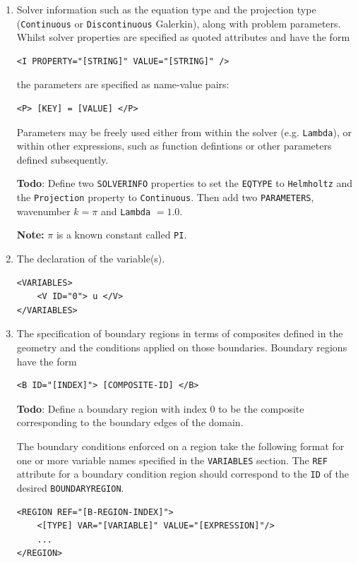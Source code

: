 \documentclass[a4paper,12pt]{article}
\begin{document}
\begin{enumerate}
\item Solver information such as the equation type and the projection type
(\texttt{Continuous} or \texttt{Discontinuous} Galerkin), along with problem
parameters. Whilst solver properties are specified as quoted
attributes and have the form
\begin{verbatim}
<I PROPERTY="[STRING]" VALUE="[STRING]" />
\end{verbatim}
the parameters are specified as name-value pairs:
\begin{verbatim}
<P> [KEY] = [VALUE] </P>
\end{verbatim}
Parameters may be freely used either from within the solver (e.g.
\texttt{Lambda}), or within other expressions, such as function defintions or
other parameters defined subsequently.

\textbf{Todo}: Define two \texttt{SOLVERINFO} properties to set the
\texttt{EQTYPE} to \texttt{Helmholtz} and the \texttt{Projection} property to
\texttt{Continuous}. Then add two \texttt{PARAMETERS}, wavenumber $k=\pi$ and
\texttt{Lambda} $=1.0$.

\smallskip
\textbf{Note: } $\pi$ is a known constant called \texttt{PI}.


\item The declaration of the variable(s).  
\begin{verbatim}
<VARIABLES>
    <V ID="0"> u </V> 
</VARIABLES>
\end{verbatim}

\item The specification of boundary regions in terms of composites defined in
the geometry and the conditions applied on those boundaries. Boundary regions
have the form
\begin{verbatim}
<B ID="[INDEX]"> [COMPOSITE-ID] </B>
\end{verbatim}

\textbf{Todo}: Define a boundary region with index 0 to be the composite
corresponding to the boundary edges of the domain. 

The boundary conditions enforced on a region take the following format for one
or more variable names specified in the \texttt{VARIABLES} section. The
\texttt{REF} attribute for a boundary condition region should correspond to the
\texttt{ID} of the desired \texttt{BOUNDARYREGION}.
\begin{verbatim}
<REGION REF="[B-REGION-INDEX]">
    <[TYPE] VAR="[VARIABLE]" VALUE="[EXPRESSION]"/>
    ...
</REGION>
\end{verbatim}


\end{enumerate}
\end{document}
